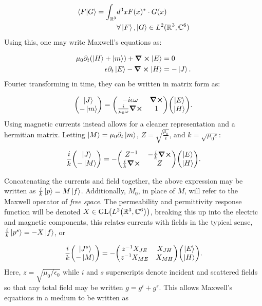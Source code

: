 \documentclass[twocolumn]{revtex4-2}
\begin{document}
\begin{align}
\braket{F}{G} = \int_{\mathbb{R}^3}&d^3xF(x)^*\cdot G(x)\\
&\forall \ket{F}, \ket{G}\in L^2(\mathbb{R}^3, \mathbb{C}^6)\nonumber
\end{align}
Using this, one may write Maxwell's equations as:

\begin{align}
\mu_0\partial_t\qty(\ket{H} + \ket{m}) + \curl\ket{E} &= 0\\
\epsilon\partial_t\ket{E} - \curl\ket{H} &= -\ket{J}.\nonumber
\end{align}
Fourier transforming in time, they can be written in matrix form as:

\begin{align}
\mqty(\ket{J} \\-\ket{m}) = \mqty(-i\epsilon\omega & \curl \\ \frac{i}{\mu_0\omega}\curl & 1)\mqty(\ket{E}\\\ket{H}).
\end{align}
Using magnetic currents instead allows for a cleaner representation and a hermitian matrix. Letting $\ket{M}=\mu_0\partial_t\ket{m}$, $Z = \sqrt{\frac{\mu_0}{\epsilon}}$, and $k = \sqrt{\mu_0\epsilon}$:

\begin{align}
\frac{i}{k}\mqty(\ket{J} \\-\ket{M}) = -\mqty(Z^{-1} & -\frac{i}{k}\curl \\ \frac{i}{k}\curl & Z)\mqty(\ket{E}\\\ket{H}).
\end{align}

Concatenating the currents and field together, the above expression may be written as $\frac{i}{k}\ket{p}=M\ket{f}$. Additionally, $M_0$, in place of $M$, will refer to the Maxwell operator of \textit{free space}. The permeability and permittivity response function will be denoted $X\in \text{GL}\qty(L^2\qty(\mathbb{R}^3,\mathbb{C}^6))$, breaking this up into the electric and magnetic components, this relates currents with fields in the typical sense, $\frac{i}{k}\ket{p^s}=-X\ket{f}$, or

\begin{align}
\frac{i}{k}\mqty(\ket{J^s}\\-\ket{M}) = -\mqty(z^{-1}X_{JE} & X_{JH}\\ z^{-1}X_{ME} & X_{MH})\mqty(\ket{E}\\\ket{H}).
\end{align}
Here, $z=\sqrt{\mu_0/\epsilon_0}$ while $i$ and $s$ superscripts denote incident and scattered fields so that any total field may be written $g = g^i + g^s$. This allows Maxwell's equations in a medium to be written as
\end{document}
